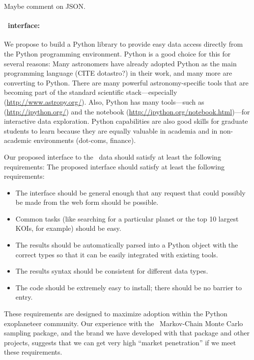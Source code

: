 \documentclass[letterpaper,12pt,preprint]{hack_aastex}
\newcommand{\kplr}{\package{kplr}}
\newcommand{\emcee}{\package{emcee}}
\begin{document}
Maybe comment on JSON.\

\paragraph{\kplr\ interface:}
We propose to build a Python library to provide easy data access directly
from the Python programming environment.
Python is a good choice for this for several reasons:
Many astronomers have already adopted Python as the main
programming language (CITE dotastro?) in their work, and many more are
converting to Python.
There are many powerful astronomy-specific tools that are becoming part of
the standard scientific stack---especially 
 (\url{http://www.astropy.org/}).
Also, Python has many tools---such as 
 (\url{http://ipython.org/}) and the  notebook
 (\url{http://ipython.org/notebook.html})---for interactive data exploration.
Python capabilities are also good skills for graduate students to learn
because they are equally valuable in academia and in non-academic
environments (dot-coms, finance).

Our proposed interface to the \Kepler\ data should satisfy at least the
following requirements:
The proposed interface should satisfy at least the following requirements:
\begin{itemize}
\item The interface should be general enough that any request that could
possibly be made from the web form should be possible.
\item Common tasks (like searching for a particular planet or the top 10
largest KOIs, for example) should be easy.
\item The results should be automatically parsed into a Python object with the
correct types so that it can be easily integrated with existing tools.
\item The results syntax should be consistent for different data types.
\item The code should be extremely easy to install; there should be no
barrier to entry.
\end{itemize}
These requirements are designed to maximize adoption within the Python
exoplaneteer community.
Our experience with the \emcee\ Markov-Chain Monte Carlo sampling package,
and the brand we have developed with that package and other projects,
suggests that we can get very high ``market penetration'' if we meet these
requirements.
\end{document}
